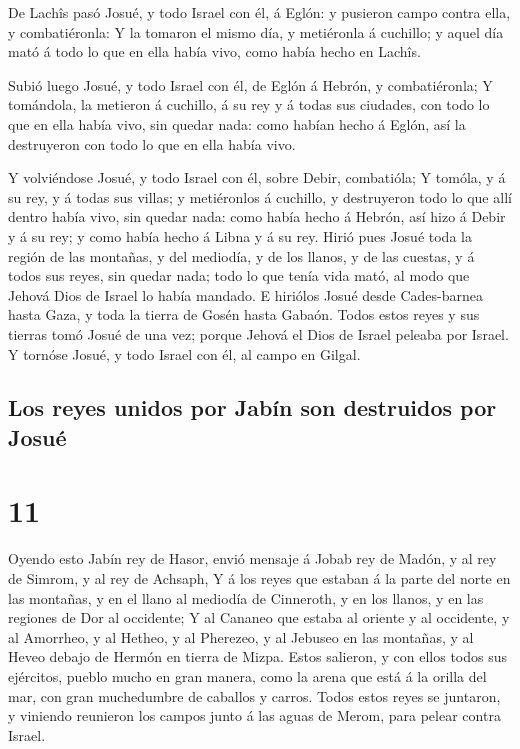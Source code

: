  De Lachîs pasó Josué, y todo Israel con él, á Eglón: y
pusieron campo contra ella, y combatiéronla:  Y la tomaron
el mismo día, y metiéronla á cuchillo; y aquel día mató á todo lo que en
ella había vivo, como había hecho en Lachîs.

 Subió luego Josué, y todo Israel con él, de Eglón á
Hebrón, y combatiéronla;  Y tomándola, la metieron á
cuchillo, á su rey y á todas sus ciudades, con todo lo que en ella había
vivo, sin quedar nada: como habían hecho á Eglón, así la destruyeron con
todo lo que en ella había vivo.

 Y volviéndose Josué, y todo Israel con él, sobre Debir,
combatióla;  Y tomóla, y á su rey, y á todas sus villas; y
metiéronlos á cuchillo, y destruyeron todo lo que allí dentro había
vivo, sin quedar nada: como había hecho á Hebrón, así hizo á Debir y á
su rey; y como había hecho á Libna y á su rey.  Hirió pues
Josué toda la región de las montañas, y del mediodía, y de los llanos, y
de las cuestas, y á todos sus reyes, sin quedar nada; todo lo que tenía
vida mató, al modo que Jehová Dios de Israel lo había mandado.
 E hiriólos Josué desde Cades-barnea hasta Gaza, y toda la
tierra de Gosén hasta Gabaón.  Todos estos reyes y sus
tierras tomó Josué de una vez; porque Jehová el Dios de Israel peleaba
por Israel.  Y tornóse Josué, y todo Israel con él, al
campo en Gilgal.

\hypertarget{los-reyes-unidos-por-jabuxedn-son-destruidos-por-josuuxe9}{%
\subsection{Los reyes unidos por Jabín son destruidos por
Josué}\label{los-reyes-unidos-por-jabuxedn-son-destruidos-por-josuuxe9}}

\hypertarget{section-10}{%
\section{11}\label{section-10}}

 Oyendo esto Jabín rey de Hasor, envió mensaje á Jobab rey
de Madón, y al rey de Simrom, y al rey de Achsaph,  Y á los
reyes que estaban á la parte del norte en las montañas, y en el llano al
mediodía de Cinneroth, y en los llanos, y en las regiones de Dor al
occidente;  Y al Cananeo que estaba al oriente y al
occidente, y al Amorrheo, y al Hetheo, y al Pherezeo, y al Jebuseo en
las montañas, y al Heveo debajo de Hermón en tierra de Mizpa.
 Estos salieron, y con ellos todos sus ejércitos, pueblo
mucho en gran manera, como la arena que está á la orilla del mar, con
gran muchedumbre de caballos y carros.  Todos estos reyes se
juntaron, y viniendo reunieron los campos junto á las aguas de Merom,
para pelear contra Israel.

